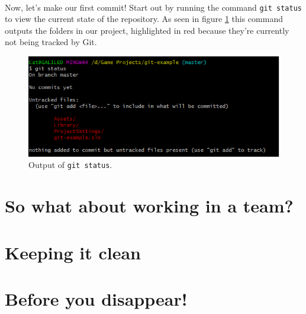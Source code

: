 \documentclass{article}
\begin{document}
\paragraph{}
Now, let's make our first commit! Start out by running the command \texttt{git status} to view the current state of the repository. As seen in figure \ref{fig:status} this command outputs the folders in our project, highlighted in red because they're currently not being tracked by Git.

\begin{figure}
    \includegraphics[width=\linewidth]{images/status.png}
    \caption{Output of \texttt{git status}.}
    \label{fig:status}
\end{figure}

\section{So what about working in a team?}
\section{Keeping it clean}
\section{Before you disappear!}
\end{document}
